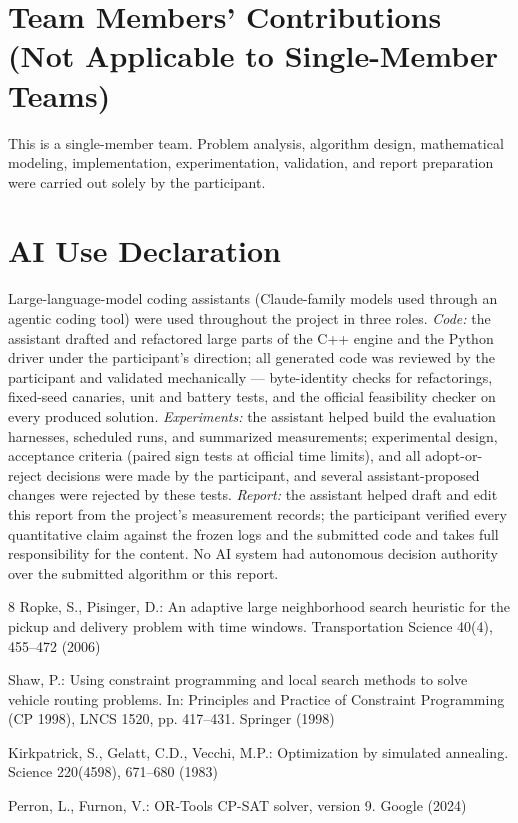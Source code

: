 \documentclass[runningheads]{llncs}
\begin{document}
\section{Team Members' Contributions\\ (Not Applicable to Single-Member Teams)}

This is a single-member team. Problem analysis, algorithm design,
mathematical modeling, implementation, experimentation, validation, and
report preparation were carried out solely by the participant.


\section{AI Use Declaration}

Large-language-model coding assistants (Claude-family models used through an
agentic coding tool) were used throughout the project in three roles.
\emph{Code:} the assistant drafted and refactored large parts of the C++
engine and the Python driver under the participant's direction; all generated
code was reviewed by the participant and validated mechanically ---
byte-identity checks for refactorings, fixed-seed canaries, unit and battery
tests, and the official feasibility checker on every produced solution.
\emph{Experiments:} the assistant helped build the evaluation harnesses,
scheduled runs, and summarized measurements; experimental design, acceptance
criteria (paired sign tests at official time limits), and all
adopt-or-reject decisions were made by the participant, and several
assistant-proposed changes were rejected by these tests. \emph{Report:} the
assistant helped draft and edit this report from the project's measurement
records; the participant verified every quantitative claim against the
frozen logs and the submitted code and takes full responsibility for the
content. No AI system had autonomous decision authority over the submitted
algorithm or this report.

\begin{thebibliography}{8}
Ropke, S., Pisinger, D.: An adaptive large neighborhood search heuristic for
the pickup and delivery problem with time windows. Transportation Science
40(4), 455--472 (2006)

Shaw, P.: Using constraint programming and local search methods to solve
vehicle routing problems. In: Principles and Practice of Constraint
Programming (CP 1998), LNCS 1520, pp. 417--431. Springer (1998)

Kirkpatrick, S., Gelatt, C.D., Vecchi, M.P.: Optimization by simulated
annealing. Science 220(4598), 671--680 (1983)

Perron, L., Furnon, V.: OR-Tools CP-SAT solver, version 9. Google (2024)
\end{thebibliography}
\end{document}
